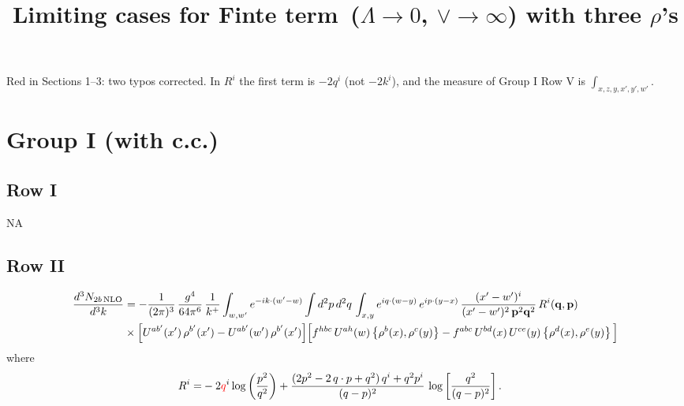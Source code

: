 \documentclass[9pt]{article}
\title{Limiting cases for Finte term\, ($\Lambda\to 0$, $\vee\to \infty$) with three $\rho$'s}
\author{}
\date{}
\numberwithin{equation}{section}
\begin{document}
\maketitle
{\color{red}\noindent Red in Sections 1--3: two typos corrected. In $R^{i}$ the first term is $-2q^{i}$ (not $-2k^{i}$), and the measure of Group I Row V is $\int_{x,z,y,x',y',w'}$.}
\section{Group I (with c.c.)}
\subsection{Row I}
\textsc{NA}
\subsection{Row II}
\begin{align}
\frac{d^{3}N_{2b\,\rm NLO}}{d^{3}k} & = -\frac{1}{(2\pi)^{3}}\,\frac{g^{4}}{64\pi^{6}}\,\frac{1}{k^{+}}\int_{w,w'} e^{-ik\cdot(w'-w)}
\int d^{2}p\,d^{2}q\,\int_{x,y} e^{iq\cdot(w-y)}\,e^{ip\cdot(y-x)}\,\frac{(x'-w')^{i}}{(x'-w')^{2}\,\mathbf{p}^{2}\mathbf{q}^{2}}\,R^{i}(\mathbf{q},\mathbf{p})\notag\\ &\times\Big[U^{ab'}(x')\,\rho^{b'}(x')-U^{ab'}(w')\,\rho^{b'}(x')\Big]
\Big[f^{hbc}\,U^{ah}(w)\left\{\rho^{b}(x),\rho^{c}(y)\right\}-f^{abc}\,U^{bd}(x)\,U^{ce}(y)\left\{\rho^{d}(x),\rho^{e}(y)\right\}\Big]
\end{align}
where
\begin{align}
R^{i} =& -2{\color{red}q}^{i}\log\left(\frac{p^{2}}{q^{2}}\right)
+\frac{(2p^{2}-2\,q\cdot p+q^{2})\,q^{i}+q^{2}p^{i}}{(q-p)^{2}}\,
\log\left[\frac{q^{2}}{(q-p)^{2}}\right].
\end{align}
\end{document}
